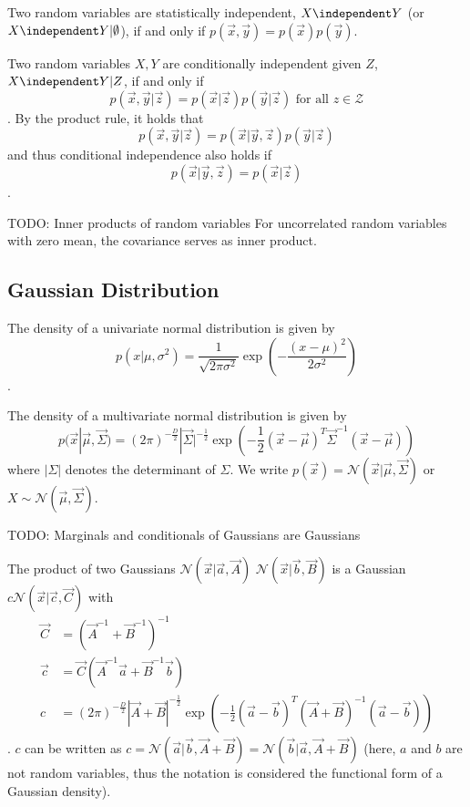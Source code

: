 Two random variables are statistically independent,
$X \independent Y$ (or $X \independent Y | \emptyset$),
if and only if
$p(\vec{x}, \vec{y}) = p(\vec{x}) p(\vec{y})$.

Two random variables $X, Y$ are conditionally independent given $Z$,
$X \independent Y | Z$,
if and only if
\begin{equation*}
    p(\vec{x}, \vec{y} | \vec{z}) = p(\vec{x} | \vec{z}) p(\vec{y} | \vec{z}) \text{ for all $z \in \mathcal{Z}$}
\end{equation*}.
By the product rule, it holds that
\begin{equation*}
    p(\vec{x}, \vec{y} | \vec{z})
    = p(\vec{x} | \vec{y}, \vec{z}) p(\vec{y} | \vec{z})
\end{equation*}
and thus conditional independence also holds if
\begin{equation*}
    p(\vec{x} | \vec{y}, \vec{z}) = p(\vec{x} | \vec{z})
\end{equation*}.

TODO: Inner products of random variables
For uncorrelated random variables with zero mean,
the covariance serves as inner product.


\subsection{Gaussian Distribution}
The density of a univariate normal distribution is given by
\begin{equation*}
    p(x | \mu, \sigma^2)
    = \frac{1}{\sqrt{2 \pi \sigma^2}}
    \exp\left(-\frac{(x - \mu)^2}{2 \sigma^2}\right)
\end{equation*}.

The density of a multivariate normal distribution is given by
\begin{equation*}
    p(\vec{x} | \vec{\mu}, \vec{\Sigma})
    = (2 \pi)^{-\frac{D}{2}} |\vec{\Sigma}|^{-\frac{1}{2}}
    \exp\left( -\frac{1}{2} (\vec{x} - \vec{\mu})^T \vec{\Sigma}^{-1} (\vec{x} - \vec{\mu}) \right)
\end{equation*}
where $|\Sigma|$ denotes the determinant of $\Sigma$.
We write $p(\vec{x}) = \mathcal{N}(\vec{x} | \vec{\mu}, \vec{\Sigma})$
or $X \sim \mathcal{N}(\vec{\mu}, \vec{\Sigma})$.

TODO: Marginals and conditionals of Gaussians are Gaussians

The product of two Gaussians
$\mathcal{N}(\vec{x} | \vec{a}, \vec{A})$
$\mathcal{N}(\vec{x} | \vec{b}, \vec{B})$ is a Gaussian
$c \mathcal{N}(\vec{x} | \vec{c}, \vec{C})$ with
\begin{align*}
    \vec{C} &= (\vec{A}^{-1} + \vec{B}^{-1})^{-1} \\
    \vec{c} &= \vec{C} (\vec{A}^{-1}\vec{a} + \vec{B}^{-1}\vec{b}) \\
    c &= (2 \pi)^{-\frac{D}{2}} |\vec{A} + \vec{B}|^{-\frac{1}{2}}
    \exp\left( -\frac{1}{2} (\vec{a} - \vec{b})^T (\vec{A} + \vec{B})^{-1} (\vec{a} - \vec{b}) \right)
\end{align*}.
$c$ can be written as
$c = \mathcal{N}(\vec{a} | \vec{b}, \vec{A} + \vec{B}) = \mathcal{N}(\vec{b} | \vec{a}, \vec{A} + \vec{B})$
(here, $a$ and $b$ are not random variables, thus the notation
is considered the functional form of a Gaussian density).

